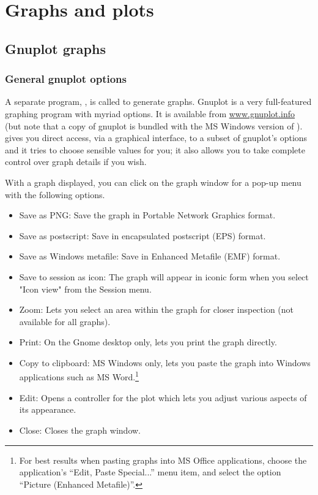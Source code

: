 \chapter{Graphs and plots}
\label{chap-graphs}


\section{Gnuplot graphs}
\label{gnuplot-graphs}

\subsection{General gnuplot options}
\label{gnuplot-opts}

A separate program, , is called to generate graphs.
Gnuplot is a very full-featured graphing program with myriad options.
It is available from \href{http://www.gnuplot.info/}{www.gnuplot.info}
(but note that a copy of gnuplot is bundled with the MS Windows
version of ).   gives you direct access, via a
graphical interface, to a subset of gnuplot's options and it tries to
choose sensible values for you; it also allows you to take complete
control over graph details if you wish.

With a graph displayed, you can click on the graph window for a pop-up
menu with the following options.

\begin{itemize}
\item \textsf{Save as PNG}: Save the graph in Portable Network
  Graphics format.
\item \textsf{Save as postscript}: Save in encapsulated postscript
  (EPS) format.
\item \textsf{Save as Windows metafile}: Save in Enhanced Metafile
  (EMF) format.
\item \textsf{Save to session as icon}: The graph will appear in
  iconic form when you select "Icon view" from the Session menu.
\item \textsf{Zoom}: Lets you select an area within the graph for
  closer inspection (not available for all graphs).
\item \textsf{Print}: On the Gnome desktop only, lets you print the
  graph directly.
\item \textsf{Copy to clipboard}: MS Windows only, lets you paste the
  graph into Windows applications such as MS Word.\footnote{For best
    results when pasting graphs into MS Office applications, choose
    the application's ``Edit, Paste Special...'' menu item, and select
    the option ``Picture (Enhanced Metafile)''.}
\item \textsf{Edit}: Opens a controller for the plot which lets you
  adjust various aspects of its appearance.
\item \textsf{Close}: Closes the graph window.
\end{itemize}


